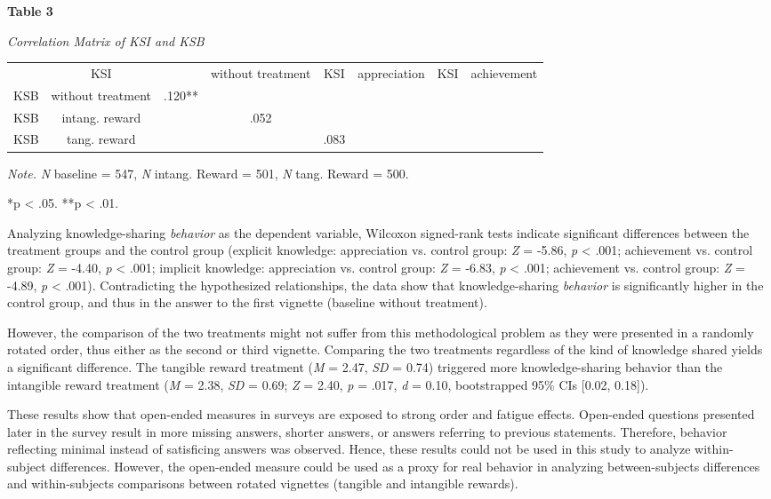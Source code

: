 \documentclass{article}
\begin{document}
\textbf{Table 3}

\emph{Correlation Matrix of KSI and KSB}


\begin{table}

  
\begin{tabular}{c  c  c  c  c  c  c  c}

   & KSI &   & without treatment & KSI &  appreciation & KSI &  achievement\\
KSB &  without treatment & .120** &  & \\
KSB &  intang. reward &  & .052  & \\
KSB &  tang. reward &  &  & .083 \\


\end{tabular}


\end{table}
\emph{Note.} \emph{N} baseline = 547, \emph{N} intang. Reward = 501, \emph{N} tang. Reward = 500. 

*p < .05. **p < .01.

Analyzing knowledge-sharing \emph{behavior} as the dependent variable, Wilcoxon signed-rank tests indicate significant differences between the treatment groups and the control group (explicit knowledge: appreciation vs. control group: \emph{Z} = -5.86, \emph{p} < .001; achievement vs. control group: \emph{Z} = -4.40, \emph{p} < .001; implicit knowledge: appreciation vs. control group:\emph{ Z} = -6.83, \emph{p} < .001; achievement vs. control group: \emph{Z} = -4.89, \emph{p} < .001). Contradicting the hypothesized relationships, the data show that knowledge-sharing \emph{behavior} is significantly higher in the control group, and thus in the answer to the first vignette (baseline without treatment).

However, the comparison of the two treatments might not suffer from this methodological problem as they were presented in a randomly rotated order, thus either as the second or third vignette. Comparing the two treatments regardless of the kind of knowledge shared yields a significant difference. The tangible reward treatment (\emph{M} = 2.47, \emph{SD} = 0.74) triggered more knowledge-sharing behavior than the intangible reward treatment (\emph{M} = 2.38, \emph{SD} = 0.69; \emph{Z} = 2.40, \emph{p} = .017, \emph{d} = 0.10, bootstrapped 95\% CIs [0.02, 0.18]).

These results show that open-ended measures in surveys are exposed to strong order and fatigue effects. Open-ended questions presented later in the survey result in more missing answers, shorter answers, or answers referring to previous statements. Therefore, behavior reflecting minimal instead of satisficing answers was observed. Hence, these results could not be used in this study to analyze within-subject differences. However, the open-ended measure could be used as a proxy for real behavior in analyzing between-subjects differences and within-subjects comparisons between rotated vignettes (tangible and intangible rewards).
\end{document}
